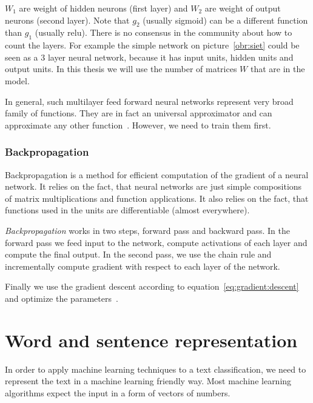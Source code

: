     $W_1$ are weight of hidden neurons (first layer) and $W_2$ are weight of output neurons (second layer). Note that $g_2$ (usually sigmoid) can be a different function than $g_1$ (usually relu).
    There is no consensus in the community about how to count the layers. 
    For example the simple network on picture~\ref{obr:siet} could be seen as a $3$ layer neural network,
    because it has input units, hidden units and output units.
    In this thesis we will use the number of matrices $W$ that are in the model.
    
    In general, such multilayer feed forward neural networks represent very broad family of functions.
    They are in fact an universal approximator and can approximate any other function~\cite{cybenko1989approximation}.
    However, we need to train them first.
    
    \subsubsection{Backpropagation} \label{sec:backprop}
    
    Backpropagation is a method for efficient computation of the gradient of a neural network.
    It relies on the fact, that neural networks are just simple compositions of matrix multiplications and function applications. It also relies on the fact, that functions used in the units are differentiable (almost everywhere).
    
    \textit{Backpropagation} works in two steps, forward pass and backward pass.
    In the forward pass we feed input to the network, compute activations of each layer and compute the final output.
    In the second pass, we use the chain rule and incrementally compute gradient with respect to each layer of the network.
    
    Finally we use the gradient descent according to equation~\ref{eq:gradient:descent} and optimize the parameters~\cite{rumelhart1986david}.
    
    
    
\section{Word and sentence representation}

    In order to apply machine learning techniques to a text classification, 
    we need to represent the text in a machine learning friendly way.
    Most machine learning algorithms expect the input in a form of vectors of numbers. 
    
